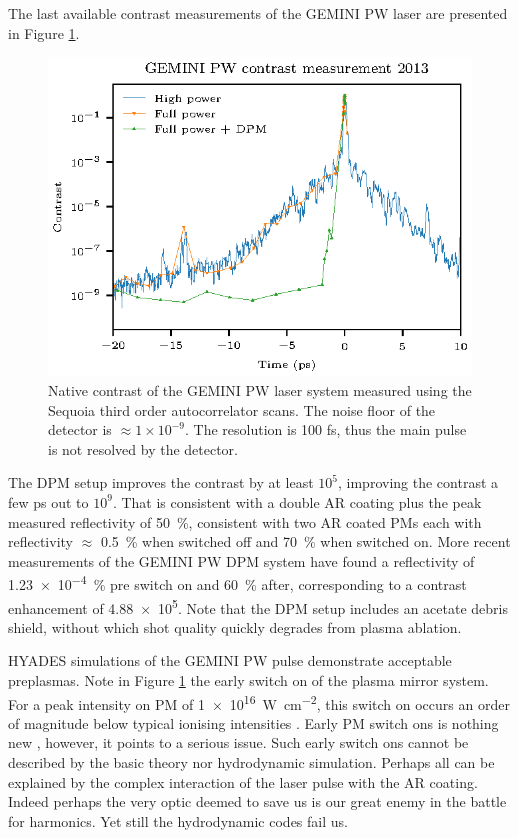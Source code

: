 The last available contrast measurements of the GEMINI PW laser are presented in Figure \ref{fig:geminicontrast}. 
\begin{figure}
	\centering
	\includegraphics{figures/gemini/gemini_contrast}
	\caption[Native contrast of the GEMINI PW laser system.]{Native contrast of the GEMINI PW laser system measured using the Sequoia third order autocorrelator scans. The noise floor of the detector is $\approx 1\times 10^{-9}$. The resolution is 100 fs, thus the main pulse is not resolved by the detector.}
	\label{fig:geminicontrast}
\end{figure}
The \ac{DPM} setup improves the contrast by at least $10^5$, improving the contrast a few ps out to $10^9$. That is consistent with a double AR coating plus the peak measured reflectivity of \qty{50}{\%}, consistent with two AR coated PMs each with reflectivity $\approx$ \qty{0.5}{\%} when switched off and \qty{70}{\%} when switched on. More recent measurements of the GEMINI PW DPM system have found a reflectivity of \qty{1.23e-4}{\%} pre switch on and \qty{60}{\%} after, corresponding to a contrast enhancement of \num{4.88e5}. Note that the DPM setup includes an acetate debris shield, without which shot quality quickly degrades from plasma ablation.

HYADES simulations of the GEMINI PW pulse demonstrate acceptable preplasmas. 
Note in Figure \ref{fig:geminicontrast} the early switch on of the plasma mirror system. For a peak intensity on \ac{PM} of \qty{1e16}{W.cm^{-2}}, this switch on occurs an order of magnitude below typical ionising intensities \cite{umstadterRelativisticLaserPlasma2003}. Early PM switch ons is nothing new \cite{caiTimeresolvedMeasurementsReflectivity2009}, however, it points to a serious issue. Such early switch ons cannot be described by the basic theory nor hydrodynamic simulation. Perhaps all can be explained by the complex interaction of the laser pulse with the AR coating. Indeed perhaps the very optic deemed to save us is our great enemy in the battle for harmonics. Yet still the hydrodynamic codes fail us. 

